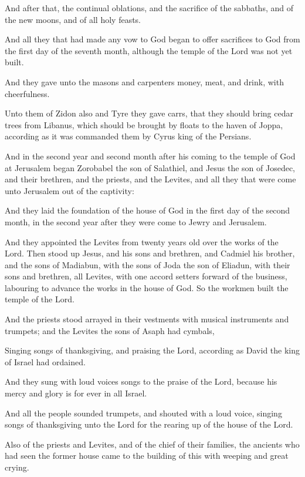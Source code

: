 {\par }{\PP {}And after that, the continual oblations, and the sacrifice of the sabbaths, and of the new moons, and of all holy feasts.
\par }{\PP {}And all they that had made any vow to God began to offer sacrifices to God from the first day of the seventh month, although the temple of the Lord was not yet built.
\par }{\PP {}And they gave unto the masons and carpenters money, meat, and drink, with cheerfulness.
\par }{\PP {}Unto them of Zidon also and Tyre they gave carrs, that they should bring cedar trees from Libanus, which should be brought by floats to the haven of Joppa, according as it was commanded them by Cyrus king of the Persians.
\par }{\PP {}And in the second year and second month after his coming to the temple of God at Jerusalem began Zorobabel the son of Salathiel, and Jesus the son of Josedec, and their brethren, and the priests, and the Levites, and all they that were come unto Jerusalem out of the captivity:
\par }{\PP {}And they laid the foundation of the house of God in the first day of the second month, in the second year after they were come to Jewry and Jerusalem.
\par }{\PP {}And they appointed the Levites from twenty years old over the works of the Lord. Then stood up Jesus, and his sons and brethren, and Cadmiel his brother, and the sons of Madiabun, with the sons of Joda the son of Eliadun, with their sons and brethren, all Levites, with one accord setters forward of the business, labouring to advance the works in the house of God. So the workmen built the temple of the Lord.
\par }{\PP {}And the priests stood arrayed in their vestments with musical instruments and trumpets; and the Levites the sons of Asaph had cymbals,
\par }{\PP {}Singing songs of thanksgiving, and praising the Lord, according as David the king of Israel had ordained.
\par }{\PP {}And they sung with loud voices songs to the praise of the Lord, because his mercy and glory is for ever in all Israel.
\par }{\PP {}And all the people sounded trumpets, and shouted with a loud voice, singing songs of thanksgiving unto the Lord for the rearing up of the house of the Lord.
\par }{\PP {}Also of the priests and Levites, and of the chief of their families, the ancients who had seen the former house came to the building of this with weeping and great crying.
}
